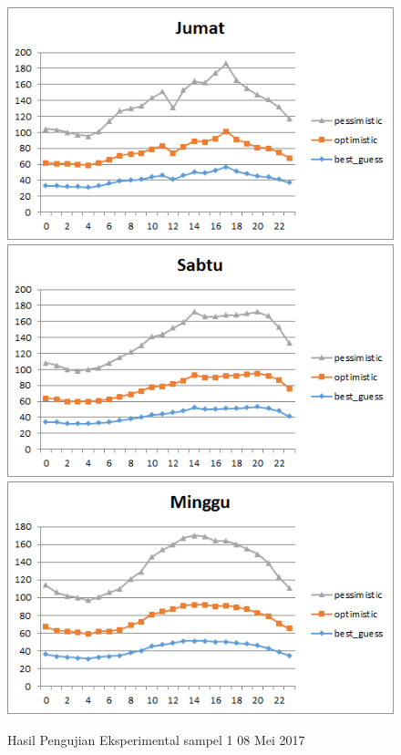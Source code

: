 			\begin{figure}[H]
				\centering		
				\includegraphics[]{Gambar/jumatsampel115052017.png}
				\includegraphics[]{Gambar/sabtusampel115052017.png}
				\includegraphics[]{Gambar/minggusampel115052017.png}
				\caption[Hasil Pengujian Eksperimental]{Hasil Pengujian Eksperimental sampel 1 08 Mei 2017}
				\label{fig:eksperimentalsampel115052017}
			\end{figure}
			\newpage
			
